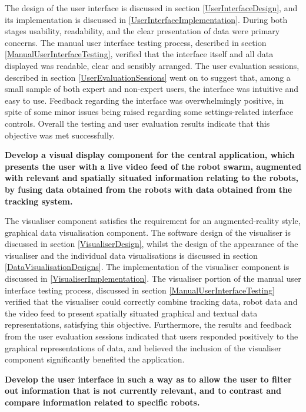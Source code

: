 The design of the user interface is discussed in section \ref{UserInterfaceDesign}, and its implementation is discussed in \ref{UserInterfaceImplementation}. During both stages usability, readability, and the clear presentation of data were primary concerns. The manual user interface testing process, described in section \ref{ManualUserInterfaceTesting}, verified that the interface itself and all data displayed was readable, clear and sensibly arranged. The user evaluation sessions, described in section \ref{UserEvaluationSessions} went on to suggest that, among a small sample of both expert and non-expert users, the interface was intuitive and easy to use. Feedback regarding the interface was overwhelmingly positive, in spite of some minor issues being raised regarding some settings-related interface controls. Overall the testing and user evaluation results indicate that this objective was met successfully.

\noindent \textbf{Develop a visual display component for the central application, which presents the user with a live video feed of the robot swarm, augmented with relevant and spatially situated information relating to the robots, by fusing data obtained from the robots with data obtained from the tracking system.}

The visualiser component satisfies the requirement for an augmented-reality style, graphical data visualisation component. The software design of the visualiser is discussed in section \ref{VisualiserDesign}, whilst the design of the appearance of the visualiser and the individual data visualisations is discussed in section \ref{DataVisualisationDesigns}. The implementation of the visualiser component is discussed in \ref{VisualiserImplementation}. The visualiser portion of the manual user interface testing process, discussed in section \ref{ManualUserInterfaceTesting} verified that the visualiser could correctly combine tracking data, robot data and the video feed to present spatially situated graphical and textual data representations, satisfying this objective. Furthermore, the results and feedback from the user evaluation sessions indicated that users responded positively to the graphical representations of data, and believed the inclusion of the visualiser component significantly benefited the application.

\noindent \textbf{Develop the user interface in such a way as to allow the user to filter out information that is not currently relevant, and to contrast and compare information related to specific robots.}

